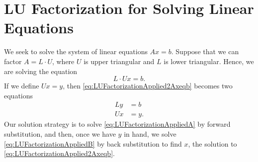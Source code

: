 
\Qed

\section{LU Factorization for Solving Linear Equations}
\label{sec:LUsolveAxEqB}

\begin{tcolorbox}[title=\Large \textbf{Solving $\mathbf{Ax=b}$ \textcolor{red}{\bf via LU} without \textcolor{red}{\bf Row Permutations}}]
We seek to solve the system of linear equations $Ax=b$. Suppose that we can factor $A=L \cdot U$, where $U$ is upper triangular and $L$ is lower triangular. Hence, we are solving the equation
\begin{equation}
\label{eq:LUFactorizationApplied2Axeqb}
  L \cdot U x = b.  
\end{equation} 
If we define $Ux=y$, then \eqref{eq:LUFactorizationApplied2Axeqb} becomes two equations
\begin{align}
  \label{eq:LUFactorizationAppliedA}
  L y &= b \\
    \label{eq:LUFactorizationAppliedB}
 U x &=y.
\end{align}
Our solution strategy is to solve \eqref{eq:LUFactorizationAppliedA} by forward substitution, and then, once we have $y$ in hand, we solve \eqref{eq:LUFactorizationAppliedB}
by back substitution to find $x$, the solution to \eqref{eq:LUFactorizationApplied2Axeqb}.
\end{tcolorbox}

